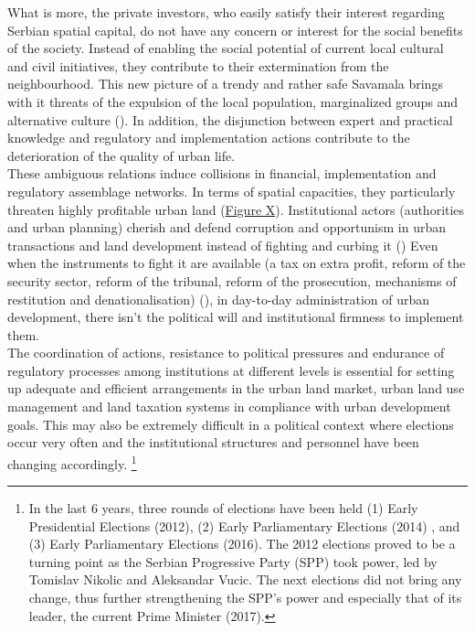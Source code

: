 \documentclass[11pt]{report}
\begin{document}
{{{What is more, the private investors, who easily satisfy their interest regarding Serbian spatial capital, do not have any concern or interest for the social benefits of the society. Instead of enabling the social potential of current local cultural and civil initiatives, they contribute to their extermination from the neighbourhood. This new picture of a trendy and rather safe Savamala brings with it threats of the expulsion of the local population, marginalized groups and alternative culture
(\href{Krusche}{\cite{krusche_bureau_2015}}).
In addition, the disjunction between expert and practical knowledge and regulatory and implementation actions contribute to the deterioration of the quality of urban life.
\\

These ambiguous relations induce collisions in financial, implementation and regulatory assemblage networks. In terms of spatial capacities, they particularly threaten highly profitable urban land (\href{FigureX}{Figure X}).
Institutional actors (authorities and urban planning) cherish and defend corruption and opportunism in urban transactions and land development instead of fighting and curbing it (\href{NedovicBudic}{\citealt{nedovic-budic_mornings_2011}})
Even when the instruments to fight it are available (a tax on extra profit, reform of the security sector, reform of the tribunal, reform of the prosecution, mechanisms of restitution and denationalisation) (\href{Vujosevic}{\citealt{vujosevic_postsocijalisticka_2010}}),
in day-to-day administration of urban
development, there isn’t the political will and institutional firmness to implement them.
\\

The coordination of actions, resistance to political pressures and endurance of regulatory processes among institutions at different levels is essential for setting up adequate and efficient arrangements in the urban land market, urban land use management and land taxation systems in compliance with urban development goals. This may also be extremely difficult in a political context where elections occur very often and the institutional structures and personnel have been changing accordingly.
\footnote{In the last 6 years, three rounds of elections have been held (1) Early Presidential Elections (2012), (2) Early Parliamentary Elections (2014) , and (3) Early Parliamentary Elections (2016).
The 2012 elections proved to be a turning point as the Serbian Progressive Party (SPP) took power, led by Tomislav Nikolic and Aleksandar Vucic. The next elections did not bring any change, thus further strengthening the SPP’s power and especially that of its leader, the current Prime Minister (2017).}
\\

}}}
\end{document}
